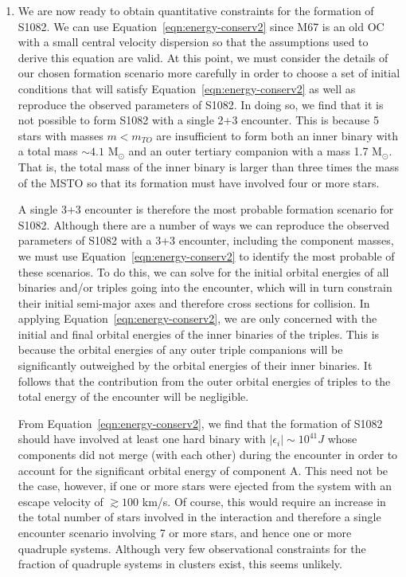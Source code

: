 \begin{enumerate}
\item We are now ready to obtain quantitative constraints for the
formation of S1082.  We can use Equation~\ref{eqn:energy-conserv2} 
since M67 is an old OC with a small central velocity
dispersion so that the assumptions used to derive this equation are valid.  
At this point, we must consider the details of our chosen formation
scenario more carefully in order to choose a set of initial conditions
that will satisfy Equation~\ref{eqn:energy-conserv2} as well as
reproduce the observed parameters of S1082.  In doing so, we find that
it is not possible to form S1082 with a single 2+3 encounter.  This is
because 5 stars with masses $m < m_{TO}$ are insufficient to form both
an inner binary with a total 
mass $\sim 4.1$ M$_{\odot}$ and an outer tertiary companion with a
mass 1.7 M$_{\odot}$.  That is, the total mass of the inner binary is
larger than three times the mass of the MSTO so that its formation
must have involved four or more stars.

A single 3+3 encounter is therefore the most probable formation
scenario for S1082.  Although there are a number of ways we can
reproduce the observed parameters of S1082 with a 3+3 encounter,
including the component masses, we must use 
Equation~\ref{eqn:energy-conserv2} to identify the most probable of
these scenarios.  To do this, we can solve for 
the initial orbital energies of all binaries and/or triples going
into the encounter, which will in turn constrain their
initial semi-major axes and therefore cross sections for collision.  
In applying Equation~\ref{eqn:energy-conserv2}, we are only concerned
with the initial and final orbital energies of the inner binaries of
the triples.  This is because the orbital energies of any outer triple
companions will be significantly outweighed by the orbital energies of
their inner binaries.  It follows that the contribution from the outer
orbital energies of triples to the total energy of the encounter will
be negligible. 

From Equation~\ref{eqn:energy-conserv2}, we find 
that the formation of S1082 should have involved at least one hard
binary with 
$|\epsilon_i| \sim 10^{41} J$ whose components did not merge (with each
other) during the encounter in order to account for the significant
orbital energy of component A.  %
This need not be the case, however, if one or more stars were ejected
from the system with an escape velocity of $\gtrsim 100$ km/s.  Of
course, this would require an increase in the total number of
stars involved in the interaction and therefore a single encounter
scenario involving 7 or more stars, and hence one or more quadruple
systems.  Although very few observational constraints for the fraction
of quadruple systems in clusters exist, this seems unlikely.


\end{enumerate}
